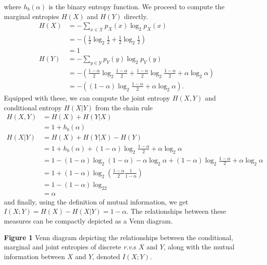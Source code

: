 \documentclass[11pt, letterpaper]{article}
\newcommand{\mc}[1]{\mathcal{#1}}
\begin{document}
where $h_b(\alpha)$ is the binary entropy function. We proceed to compute the marginal entropies $H(X)$ and $H(Y)$ directly.
\begin{align*}
    H(X)&=-\sum_{x\in\mc{X}}p_X(x)\log_2p_X(x)\\
    &=-\left(\frac{1}{2}\log_2\frac{1}{2}+\frac{1}{2}\log_2\frac{1}{2}\right)\\
    &=1\\
    H(Y)&=-\sum_{y\in\mc{Y}}p_Y(y)\log_2p_Y(y)\\
    &=-\left(\frac{1-\alpha}{2}\log_2\frac{1-\alpha}{2}+\frac{1-\alpha}{2}\log_2\frac{1-\alpha}{2}+\alpha\log_2\alpha\right)\\
    &=-\left((1-\alpha)\log_2\frac{1-\alpha}{2}+\alpha\log_2\alpha\right).
\end{align*}
Equipped with these, we can compute the joint entropy $H(X,Y)$ and conditional entropy $H(X|Y)$ from the chain rule
\begin{align*}
    H(X,Y)&=H(X)+H(Y|X)\\
    &=1+h_b(\alpha)\\
    H(X|Y)&=H(X)+H(Y|X)-H(Y)\\
    &=1+h_b(\alpha)+(1-\alpha)\log_2\frac{1-\alpha}{2}+\alpha\log_2\alpha\\
    &=1-(1-\alpha)\log_2(1-\alpha)-\alpha\log_2\alpha+(1-\alpha)\log_2\frac{1-\alpha}{2}+\alpha\log_2\alpha\\
    &=1+(1-\alpha)\log_2\left(\frac{1-\alpha}{2}\frac{1}{1-\alpha}\right)\\
    &=1-(1-\alpha)\log_22\\
    &=\alpha
\end{align*}
and finally, using the definition of mutual information, we get $I(X;Y)=H(X)-H(X|Y)=1-\alpha$. The relationships between these measures can be compactly depicted
as a Venn diagram.
\begin{center}
\end{center}
{\bf Figure 1} Venn diagram depicting the relationships between the conditional, marginal and joint entropies of discrete {\it r.v.}s $X$ and $Y$, along with
the mutual information between $X$ and $Y$, denoted $I(X;Y)$.
\end{document}
